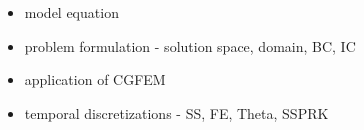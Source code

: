 \begin{itemize}
\item model equation
\item problem formulation - solution space, domain, BC, IC
\item application of CGFEM
\item temporal discretizations - SS, FE, Theta, SSPRK
\end{itemize}
